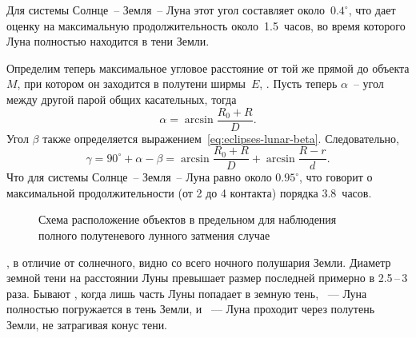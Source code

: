 Для системы Солнце~-- Земля~-- Луна этот угол составляет около~$0.4^\circ$, что дает оценку на максимальную продолжительность  около~1.5~часов, во время которого Луна полностью находится в тени Земли.

Определим теперь максимальное угловое расстояние от той же прямой до объекта $M$, при котором он заходится в полутени ширмы~$E$, . Пусть теперь $\alpha$~-- угол между другой парой общих касательных, тогда
\begin{equation*}
    \alpha = \arcsin \frac{R_0 + R}{D}.
\end{equation*}
Угол $\beta$ также определяется выражением~\eqref{eq:eclipses-lunar-beta}. Следовательно,
\begin{equation*}
    \gamma = 90^\circ + \alpha - \beta = \arcsin \frac{R_0 + R}{D} + \arcsin \frac{R - r}{d}.
\end{equation*}
Что для системы Солнце~-- Земля~-- Луна равно около $0.95^\circ$, что говорит о максимальной продолжительности  (от 2 до 4 контакта) порядка $3.8$~часов.

\begin{figure}[h!]
    \centering
    
    \caption{Схема расположение объектов в предельном для наблюдения полного полутеневого лунного затмения случае}
    \label{pic:eclipses-semi-shadow-lunar-eclipse}    
\end{figure}

% 
%
%    
, в отличие от солнечного, видно со всего ночного полушария Земли. Диаметр земной тени на расстоянии Луны превышает размер последней примерно в 2.5\,--\,3 раза. Бывают , когда лишь часть Луны попадает в земную тень, ~--- Луна полностью погружается в тень Земли, и ~--- Луна проходит через полутень Земли, не затрагивая конус тени.


